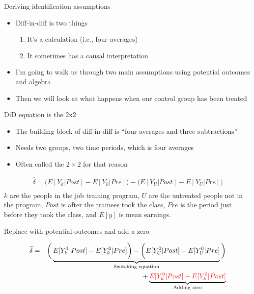 \documentclass{beamer}
\begin{document}
\begin{frame}{Deriving identification assumptions}

\begin{itemize}

\item Diff-in-diff is two things 
	\begin{enumerate}
	\item It's a calculation (i.e., four averages)
	\item It sometimes has a causal interpretation
	\end{enumerate}
\item I'm going to walk us through two main assumptions using potential outcomes and algebra
\item Then we will look at what happens when our control group has been treated
\end{itemize}

\end{frame}


\begin{frame}{DiD equation is the 2x2}

\begin{itemize}
\item The building block of diff-in-diff is ``four averages and three subtractions'' 
\item Needs two groups, two time periods, which is four averages
\item Often called the $2 \times 2$ for that reason
\end{itemize}

\begin{eqnarray*}
\widehat{\delta} = \bigg ( E[Y_k|Post] - E[Y_k|Pre] \bigg ) - \bigg ( E[Y_U | Post ] - E[ Y_U | Pre] \bigg) \\
\end{eqnarray*}$k$ are the people in the job training program, $U$ are the untreated people not in the program, $Post$ is after the trainees took the class, $Pre$ is the period just before they took the class, and $E[y]$ is mean earnings. 

\end{frame}



\begin{frame}{Replace with potential outcomes and add a zero}

\begin{eqnarray*}
\widehat{\delta} &=& \bigg ( \underbrace{E[Y^1_k|Post] - E[Y^0_k|Pre] \bigg ) - \bigg ( E[Y^0_U | Post ] - E[ Y^0_U | Pre]}_{\mathclap{\text{Switching equation}}} \bigg)  \\
&&+ \underbrace{\textcolor{red}{E[Y_k^0 |Post] - E[Y^0_k | Post]}}_{\mathclap{\text{Adding zero}}} 
\end{eqnarray*}

\end{frame}
\end{document}
